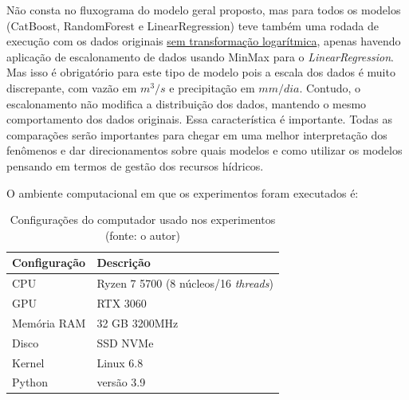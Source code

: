 Não consta no fluxograma do modelo geral proposto, mas para todos os modelos (CatBoost, RandomForest e LinearRegression) teve também uma rodada de execução com os dados originais \underline{sem transformação logarítmica}, apenas havendo aplicação de escalonamento de dados usando MinMax para o \textit{LinearRegression}. Mas isso é obrigatório para este tipo de modelo pois a escala dos dados é muito discrepante, com vazão em $m^3/s$ e precipitação em $mm/dia$. Contudo, o escalonamento não modifica a distribuição dos dados, mantendo o mesmo comportamento dos dados originais. Essa característica é importante. Todas as comparações serão importantes para chegar em uma melhor interpretação dos fenômenos e dar direcionamentos sobre quais modelos e como utilizar os modelos pensando em termos de gestão dos recursos hídricos.



O ambiente computacional em que os experimentos foram executados é:

\begin{table}[!h]
	\centering \small
	\caption{Configurações do computador usado nos experimentos\\(fonte: o autor)}
	\begin{tabular}{|l|l|} \hline 
		\textbf{Configuração} & \textbf{Descrição} \\\hline
		CPU                   & Ryzen 7 5700 (8 núcleos/16 \textit{threads}) \\\hline
		GPU                   & RTX 3060                                     \\\hline
		Memória RAM           & 32 GB 3200MHz                                \\\hline
		Disco                 & SSD NVMe                                     \\\hline
		Kernel                & Linux 6.8                                    \\\hline
		Python                & versão 3.9                                   \\\hline
	\end{tabular}
	\label{tab:config_pc}
\end{table}

